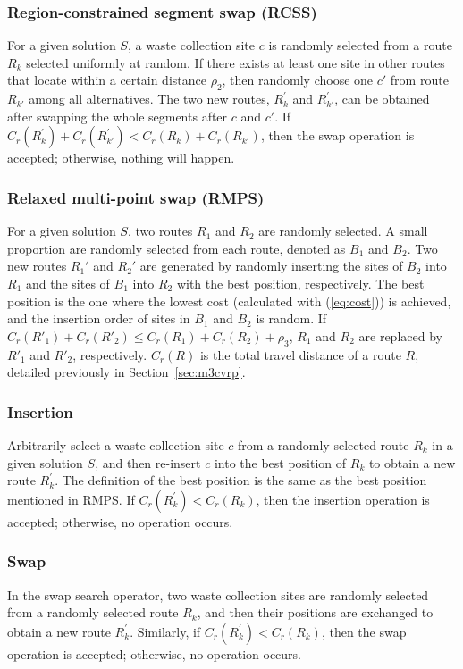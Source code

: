 \documentclass[journal]{IEEEtran}
\begin{document}
\subsubsection{Region-constrained segment swap (RCSS)} 
For a given solution $S$, a waste collection site $c$ is randomly selected from a route $R_k$ selected uniformly at random. If there exists at least one site in other routes that locate within a certain distance $\rho_2$, then randomly choose one $c'$ from route $R_{k'}$ among all alternatives. The two new routes, $R_k^{'}$ and $R_{k'}^{'}$, can be obtained after swapping the whole segments after $c$ and $c'$. If $C_r(R_k^{'})+C_r(R_{k'}^{'})<C_r(R_k)+C_r(R_{k'})$, then the swap operation is accepted; otherwise, nothing will happen.

\subsubsection{Relaxed multi-point swap (RMPS)} 
For a given solution $S$, two routes $R_1$ and $R_2$ are randomly selected. A small proportion are randomly selected from each route, denoted as $B_1$ and $B_2$. Two new routes $R_1'$ and $R_2'$ are generated by randomly inserting the sites of $B_2$ into $R_1$ and the sites of $B_1$ into $R_2$ with the best position, respectively. The best position is the one where the lowest cost (calculated with (\ref{eq:cost})) is achieved, and the insertion order of sites in $B_1$ and $B_2$ is random. If $C_r(R'_{1})+C_r(R'_{2}) \leq C_r(R_1)+C_r(R_2)+\rho_3$, $R_1$ and $R_2$ are replaced by $R'_1$ and $R'_2$, respectively. $C_r(R)$ is the total travel distance of a route $R$, detailed previously in Section~\ref{sec:m3cvrp}.

\subsubsection{Insertion} 
Arbitrarily select a waste collection site $c$ from a randomly selected route $R_k$ in a given solution $S$, and then re-insert $c$ into the best position of $R_k$ to obtain a new route $R_{k}^{'}$. The definition of the best position is the same as the best position mentioned in RMPS. If $C_r(R_{k}^{'})<C_r(R_k)$, then the insertion operation is accepted; otherwise, no operation occurs.

\subsubsection{Swap} In the swap search operator, two waste collection sites are randomly selected from a randomly selected route $R_k$, and then their positions are exchanged to obtain a new route $R_{k}^{'}$. Similarly, if $C_r(R_{k}^{'})<C_r(R_k)$, then the swap operation is accepted; otherwise, no operation occurs.
\end{document}
